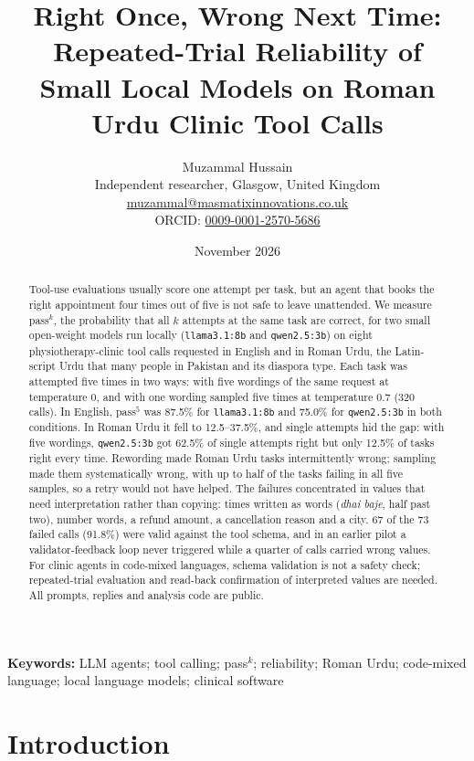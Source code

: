 \documentclass[11pt,a4paper]{article}
\title{\textbf{Right Once, Wrong Next Time: Repeated-Trial Reliability of\\Small Local Models on Roman Urdu Clinic Tool Calls}}
\author{Muzammal Hussain\\
\small Independent researcher, Glasgow, United Kingdom\\
\small \href{mailto:muzammal@masmatixinnovations.co.uk}{muzammal@masmatixinnovations.co.uk}\\
\small ORCID: \href{https://orcid.org/0009-0001-2570-5686}{0009-0001-2570-5686}}
\date{\small November 2026}
\newcommand{\code}[1]{\texttt{#1}}
\newcommand{\passk}[1]{pass$^{#1}$}
\begin{document}
\maketitle

\begin{abstract}
\noindent
Tool-use evaluations usually score one attempt per task, but an agent that books the right appointment four times
out of five is not safe to leave unattended. We measure \passk{k}, the probability that all $k$ attempts at the same
task are correct, for two small open-weight models run locally (\code{llama3.1:8b} and \code{qwen2.5:3b}) on eight
physiotherapy-clinic tool calls requested in English and in Roman Urdu, the Latin-script Urdu that many people in
Pakistan and its diaspora type. Each task was attempted five times in two ways: with five wordings of the same
request at temperature 0, and with one wording sampled five times at temperature 0.7 (320 calls). In English,
\passk{5} was 87.5\% for \code{llama3.1:8b} and 75.0\% for \code{qwen2.5:3b} in both conditions. In Roman Urdu it
fell to 12.5--37.5\%, and single attempts hid the gap: with five wordings, \code{qwen2.5:3b} got 62.5\% of single
attempts right but only 12.5\% of tasks right every time. Rewording made Roman Urdu tasks intermittently wrong;
sampling made them systematically wrong, with up to half of the tasks failing in all five samples, so a retry would
not have helped. The failures concentrated in values that need interpretation rather than copying: times written as
words (\emph{dhai baje}, half past two), number words, a refund amount, a cancellation reason and a city. 67 of the 73
failed calls (91.8\%) were valid against the tool schema, and in an earlier pilot a validator-feedback loop never
triggered while a quarter of calls carried wrong values. For clinic agents in code-mixed languages, schema
validation is not a safety check; repeated-trial evaluation and read-back confirmation of interpreted values are
needed. All prompts, replies and analysis code are public.
\end{abstract}

\noindent\textbf{Keywords:} LLM agents; tool calling; pass$^k$; reliability; Roman Urdu; code-mixed language; local language models; clinical software

\section{Introduction}
\end{document}
